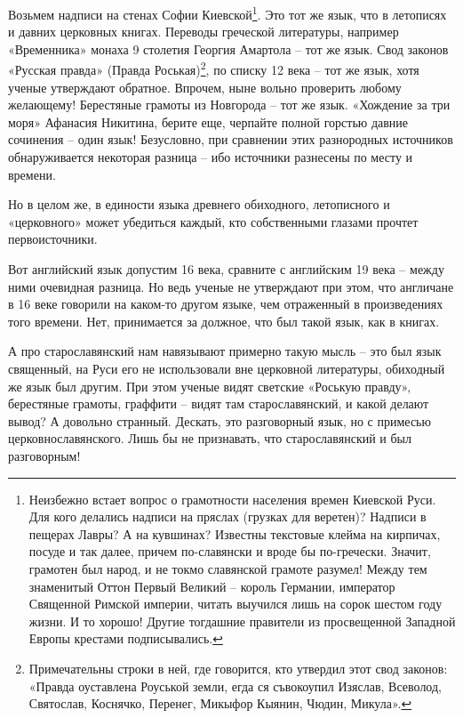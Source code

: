 Возьмем надписи на стенах Софии Киевской\footnote{Неизбежно встает вопрос о грамотности населения времен Киевской Руси. Для кого делались надписи на пряслах (грузках для веретен)? Надписи в пещерах Лавры? А на кувшинах? Известны текстовые клейма на кирпичах, посуде и так далее, причем по-славянски и вроде бы по-гречески. Значит, грамотен был народ, и не токмо славянской грамоте разумел! Между тем знаменитый Оттон Первый Великий – король Германии, император Священной Римской империи, читать выучился лишь на сорок шестом году жизни. И то хорошо! Другие тогдашние правители из просвещенной Западной Европы крестами подписывались.}. Это тот же язык, что в летописях и давних церковных книгах. Переводы греческой литературы, например «Временника» монаха 9 столетия Георгия Амартола – тот же язык. Свод законов «Русская правда» (Правда Роськая)\footnote{Примечательны строки в ней, где говорится, кто утвердил этот свод законов: «Правда оуставлена Роуськой земли, егда ся съвокоупил Изяслав, Всеволод, Святослав, Коснячко, Перенег, Микыфор Кыянин, Чюдин, Микула».}, по списку 12 века – тот же язык, хотя ученые утверждают обратное. Впрочем, ныне вольно проверить любому желающему! Берестяные грамоты из Новгорода – тот же язык. «Хождение за три моря» Афанасия Никитина, берите еще, черпайте полной горстью давние сочинения – один язык! Безусловно, при сравнении этих разнородных источников обнаруживается некоторая разница – ибо  источники разнесены по месту и времени.

Но в целом же, в единости языка древнего обиходного, летописного и «церковного» может убедиться каждый, кто собственными глазами прочтет первоисточники.
 
Вот английский язык допустим 16 века, сравните с английским 19 века – между ними очевидная разница. Но ведь ученые не утверждают при этом, что англичане в 16 веке говорили на каком-то другом языке, чем отраженный в произведениях того времени. Нет, принимается за должное, что был такой язык, как в книгах.

А про старославянский нам навязывают примерно такую мысль – это был язык священный, на Руси его не использовали вне церковной литературы, обиходный же язык был другим. При этом ученые видят светские «Роськую правду», берестяные грамоты, граффити – видят там старославянский, и какой делают вывод? А довольно странный. Дескать, это разговорный язык, но с примесью церковнославянского. Лишь бы не признавать, что старославянский и был разговорным!


